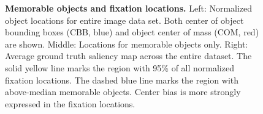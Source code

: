\begin{figure}[t]
\centering
{}
\vspace{-5mm}\caption{\footnotesize\textbf{Memorable objects and fixation locations.} Left: Normalized object locations for entire image data set. %
Both center of object bounding boxes (CBB, blue) and object center of mass (COM, red) are shown. Middle: Locations for memorable objects only. Right: Average ground truth saliency map across the entire dataset. The solid yellow line marks the region with 95\% of all normalized fixation locations. The dashed blue line marks the region with above-median memorable objects. Center bias is more strongly expressed in the fixation locations.}\label{fig:fixPos}
\end{figure}





